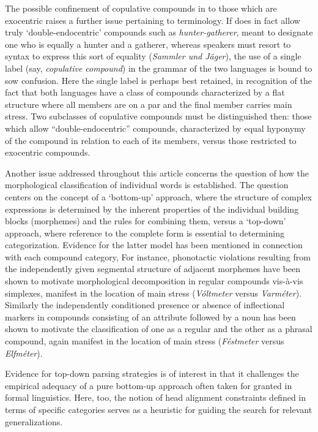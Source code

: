 \documentclass[output=paper
 ,nobabel
 ,draftmode
 ,colorlinks, citecolor=brown
]{langscibook}
\begin{document}
The possible confinement of copulative compounds in  to those which are exocentric raises a
further issue pertaining to terminology. If  does in fact allow truly `double-endocentric'
compounds such as \emph{hunter-gatherer}, meant to designate one who is equally a hunter and a
gatherer, whereas  speakers must resort to syntax to express this sort of equality
(\emph{Sammler und Jäger}), the use of a single label (say, \emph{copulative compound}) in the
grammar of the two languages is bound to sow confusion. Here the single label is perhaps
best retained, in recognition of the fact that both languages have a class of compounds
characterized by a flat structure where all members are on a par and the final member carries main
stress. 
Two subclasses of copulative compounds must be distinguished then: those which allow
``double-endocentric'' compounds, characterized by equal hyponymy of the compound in relation to
each of its members, versus those restricted to exocentric compounds.

Another issue addressed throughout this article concerns the question of how the morphological
classification of individual words is established. The question centers on the concept of a  
`bottom-up' approach, where the structure of complex expressions is determined by the inherent
properties of the individual building blocks (morphemes) and the rules for combining them, versus a  
`top-down' approach, where reference to the complete form is essential to determining
categorization. Evidence for the latter model has been mentioned in connection with each compound
category, For instance, phonotactic violations resulting from the independently given segmental
structure of adjacent morphemes have been shown to motivate morphological decomposition in regular
compounds vis-à-vis simplexes, manifest in the location of main stress (\emph{Vóltmeter} versus
\emph{Varméter}). Similarly the independently conditioned presence or absence of inflectional
markers in compounds consisting of an attribute followed by a noun has been shown to motivate the
classification of one as a regular and the other as a phrasal compound, again manifest in the
location of main stress (\emph{Féstmeter} versus \emph{Elfméter}). 

Evidence for top-down parsing strategies is of interest in that it challenges the empirical adequacy of a pure bottom-up approach often taken for granted in formal linguistics. Here, too, the notion of head alignment constraints defined in terms of specific categories serves as a heuristic for guiding the search for relevant generalizations.
\end{document}
